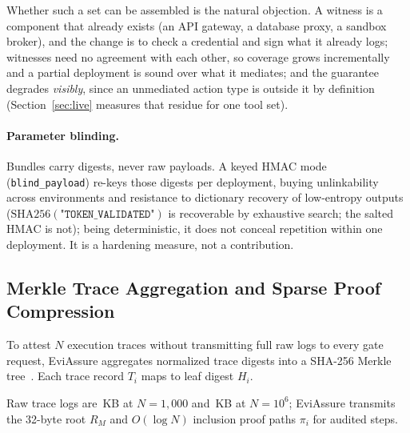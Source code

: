 \documentclass[letterpaper,10pt,twocolumn]{article}
\theoremstyle{definition}
\begin{document}
Whether such a set can be assembled is the natural objection. A witness is a component that already exists (an API gateway, a database proxy, a sandbox broker), and the change is to check a credential and sign what it already logs; witnesses need no agreement with each other, so coverage grows incrementally and a partial deployment is sound over what it mediates; and the guarantee degrades \emph{visibly}, since an unmediated action type is outside it by definition (Section~\ref{sec:live} measures that residue for one tool set).

\paragraph{Parameter blinding.} Bundles carry digests, never raw payloads. A keyed HMAC mode (\texttt{blind\_payload}) re-keys those digests per deployment, buying unlinkability across environments and resistance to dictionary recovery of low-entropy outputs ($\mathrm{SHA256}(\texttt{"TOKEN\_VALIDATED"})$ is recoverable by exhaustive search; the salted HMAC is not); being deterministic, it does not conceal repetition within one deployment. It is a hardening measure, not a contribution.

\subsection{Merkle Trace Aggregation and Sparse Proof Compression}
To attest $N$ execution traces without transmitting full raw logs to every gate request, EviAssure aggregates normalized trace digests into a SHA-256 Merkle tree~\cite{merkle1989digital, laurie2014certificate}. Each trace record $T_i$ maps to leaf digest $H_i$.

Raw trace logs are \rawSizeOneKKb{}\,KB at $N=1,000$ and \rawSizeOneMKb{}\,KB at $N=10^6$; EviAssure transmits the 32-byte root $R_M$ and $O(\log N)$ inclusion proof paths $\pi_i$ for audited steps. 
\end{document}
